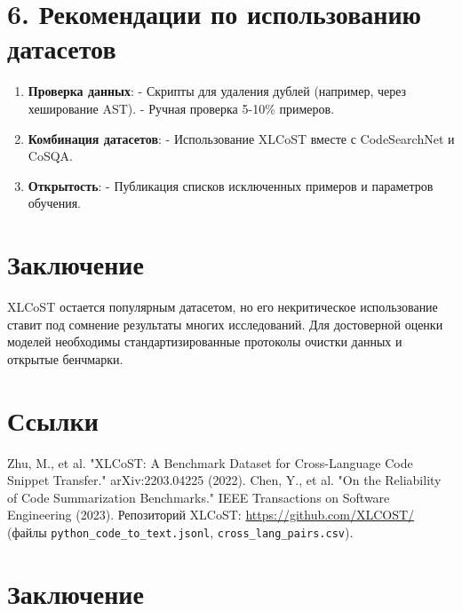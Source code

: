 \documentclass[14pt]{article}
\theoremstyle{definition}
\begin{document}
\section*{6. Рекомендации по использованию датасетов}

\begin{enumerate}
    \item \textbf{Проверка данных}:  
      - Скрипты для удаления дублей (например, через хеширование AST).  
      - Ручная проверка 5-10\% примеров.
    \item \textbf{Комбинация датасетов}:  
      - Использование XLCoST вместе с CodeSearchNet и CoSQA.
    \item \textbf{Открытость}:  
      - Публикация списков исключенных примеров и параметров обучения.
\end{enumerate}

\section*{Заключение}

XLCoST остается популярным датасетом, но его некритическое использование ставит под сомнение результаты многих исследований. Для достоверной оценки моделей необходимы стандартизированные протоколы очистки данных и открытые бенчмарки.

\section*{Ссылки}
\begin{thebibliography}{9}
 Zhu, M., et al. "XLCoST: A Benchmark Dataset for Cross-Language Code Snippet Transfer." arXiv:2203.04225 (2022).
 Chen, Y., et al. "On the Reliability of Code Summarization Benchmarks." IEEE Transactions on Software Engineering (2023).
 Репозиторий XLCoST: \url{https://github.com/XLCOST/} (файлы \texttt{python\_code\_to\_text.jsonl}, \texttt{cross\_lang\_pairs.csv}).
\end{thebibliography}



\newpage
\section{Заключение}
\end{document}
